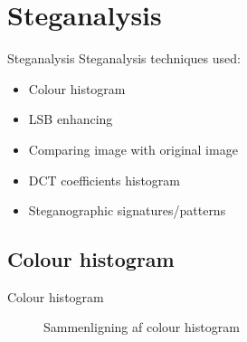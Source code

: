 \section{Steganalysis}
\begin{frame}{Steganalysis}{}
	Steganalysis techniques used:
	\begin{itemize}
		\item Colour histogram
		\item LSB enhancing
		\item Comparing image with original image
		\item DCT coefficients histogram
		\item Steganographic signatures/patterns
	\end{itemize}
\end{frame}

\subsection{Colour histogram}
\begin{frame}{Colour histogram}{}
\begin{figure}
\centering     %
{}
\end{figure}
\begin{figure}
\centering
{}
\caption{Sammenligning af colour histogram}
\end{figure}
\end{frame}

